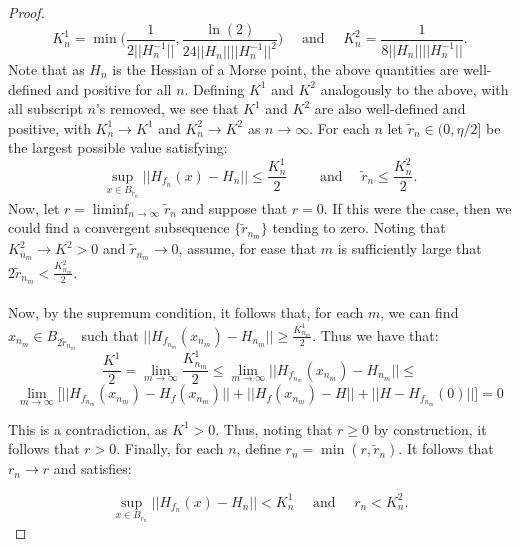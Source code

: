 \documentclass[11pt]{article}
\newcommand{\1}{\mathbf{1}}
\theoremstyle{definition}
\theoremstyle{remark}
\begin{document}
\begin{proof}
\begin{equation}\nonumber
    K^1_n = \min\bigg(\frac{1}{2||H_n^{-1}||},  \frac{\ln(2)}{24||H_n||||H_n^{-1}||^2}\bigg) \quad \text{ and }\quad K^2_n = \frac{1}{8||H_n||||H_n^{-1}||}.
\end{equation}
Note that as $H_n$ is the Hessian of a Morse point, the above quantities are well-defined and positive for all $n$. Defining $K^1$ and $K^2$ analogously to the above, with all subscript $n$'s removed, we see that $K^1$ and $K^2$ are also well-defined and positive, with $K^1_n\rightarrow K^1$ and $K^2_n\rightarrow K^2$ as $n\rightarrow \infty$. For each $n$ let $\tilde{r}_n \in (0,\eta/2]$ be the largest possible value satisfying:
\begin{equation}\label{eq:ineq_rn}
    \sup_{x \in B_{\tilde{r}_n}}||H_{f_n}(x)-H_n|| \leq \frac{K_n^1}{2} \quad \quad\text{ and }\quad \tilde{r}_n \leq \frac{K_n^2}{2}.
\end{equation}
Now, let $r=\liminf_{n\rightarrow\infty}\tilde{r}_n$ and suppose that $r=0$. If this were the case, then we could find a convergent subsequence $\{\tilde{r}_{n_m}\}$ tending to zero. Noting that $K_{n_m}^2\rightarrow K^2 > 0$ and $\tilde{r}_{n_m} \rightarrow 0$, assume, for ease that $m$ is sufficiently large that $2\tilde{r}_{n_m}<\frac{K_{n_m}^2}{2}$.\\
\\
Now, by the supremum condition, it follows that, for each $m$, we can find $x_{n_m}\in B_{2\tilde{r}_{n_m}}$ such that $||H_{f_{n_m}}(x_{n_m})-H_{n_m}||\geq \frac{K_{n_m}^1}{2}$. Thus we have that:
\begin{equation}\nonumber
    \frac{K^1}{2} = \lim_{m\rightarrow \infty} \frac{K_{n_m}^1}{2} \leq \lim_{m\rightarrow \infty}\big|\big|H_{f_{n_m}}(x_{n_m})-H_{n_m}\big|\big| \leq
\end{equation}
\begin{equation}\nonumber
     \lim_{m\rightarrow \infty}\bigg[\big|\big|H_{f_{n_m}}(x_{n_m})-H_{f}(x_{n_m})\big|\big|+\big|\big|H_{f}(x_{n_m})-H\big|\big|+\big|\big|H-H_{f_{n_m}}(0)\big|\big|\bigg]=0
\end{equation}

\noindent
This is a contradiction, as $K^1>0$. Thus, noting that $r\geq 0$ by construction, it follows that $r>0$. Finally, for each $n$, define $r_n=\min(r,\tilde{r}_n)$. It follows that $r_n\rightarrow r$ and satisfies:

\begin{equation}\nonumber
    \sup_{x \in B_{r_n}}||H_{f_n}(x)-H_n|| < K_n^1  \quad\text{ and }\quad r_n < K_n^2.
\end{equation}


\end{proof}
\end{document}
